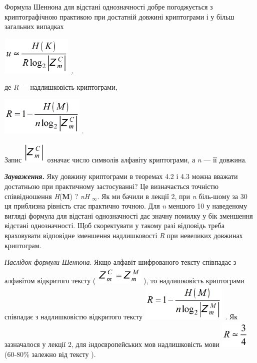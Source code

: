Формула Шеннона для відстані однозначності добре погоджується з криптографічною
практикою при достатній довжині криптограми  і у більш загальних випадках

{\itshape
 \includegraphics[width=1.3335in,height=0.7189in]{crypt-img/crypt-img45.png} ,}

де \textit{R}\textit{ }--- надлишковість криптограми,  

{\centering
 \includegraphics[width=1.5626in,height=0.7118in]{crypt-img/crypt-img46.png} .
\par}

Запис 
\includegraphics[width=0.4374in,height=0.4063in]{crypt-img/crypt-img47.png} 
означає число символів алфавіту криптограми, а \textit{n} --- її довжина. 

\textbf{\textit{Зауваження}}\textbf{.} Яку довжину криптограми в теоремах 4.2 і
4.3 можна вважати достатньою при практичному застосуванні? Це визначається
точністю співвідношення  \textit{H}(\textbf{M})  $?$\textit{  }\textit{nH}
$_{\infty }$. Як ми бачили в лекції 2, при \textit{n} біль-шому за 30 ця
приблизна рівність стає практично точною. Для \textit{n}\textit{ }меншого 10 у
наведеному вигляді формула для відстані однозначності дає значну помилку у бік
зменшення відстані однозначності. Щоб скоректувати у такому разі відповідь
треба враховувати відповідне зменшення надлишковості \textit{R} при невеликих
довжинах криптограм.

\textit{Наслідок формули Шеннона}. Якщо алфавіт шифрованого тексту співпадає з
алфавітом відкритого тексту (
\includegraphics[width=0.9016in,height=0.3339in]{crypt-img/crypt-img48.png} ),
то надлишковість криптограми співпадає з надлишковістю відкритого тексту
\includegraphics[width=1.6252in,height=0.7075in]{crypt-img/crypt-img49.png} . 
Як зазначалося у лекції 2, для iндоєвропейських мов надлишковість мови 
\includegraphics[width=0.5516in,height=0.5209in]{crypt-img/crypt-img50.png}   
(60-80\% залежно від тексту ).


